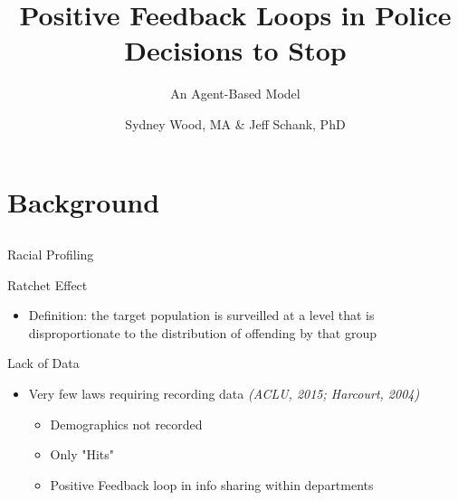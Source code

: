 \documentclass[compress,xcolor=table]{beamer}
\title{Positive Feedback Loops \newline in Police Decisions \newline to Stop }
\subtitle{An Agent-Based Model} %
\date{\formatdate{01}{05}{2020}}
\author{Sydney Wood, MA \& Jeff Schank, PhD}
\institute{UC Davis Graduate Psychology Conference} %
\begin{document}
\begin{frame}[plain]
\titlepage
\setcounter{framenumber}{0}
\end{frame}

\section{Background} \subsection{}

\begin{frame}{Racial Profiling}

\begin{block}{Ratchet Effect}
		
\begin{itemize}
\item Definition: the target population is surveilled at a level that is disproportionate to the distribution of offending by that group
\end{itemize}
		
\end{block}
	
\begin{alertblock}{Lack of Data}
    \begin{itemize}
        \item Very few laws requiring recording data \nocite{harcourt2004rethinking, ACLU} \textit{(ACLU, 2015; Harcourt, 2004)}
        \begin{itemize}
            \item Demographics not recorded
            \item Only "Hits"
            \item Positive Feedback loop in info sharing within departments
            
        \end{itemize}

    \end{itemize}
\end{alertblock}
	

	
\end{frame}
\end{document}
